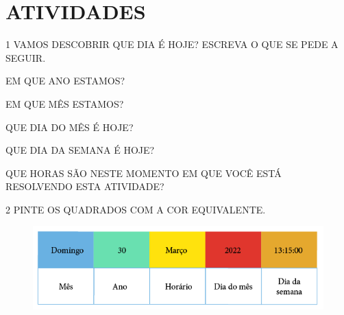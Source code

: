 \pagebreak
\section*{ATIVIDADES}

\num{1} VAMOS DESCOBRIR QUE DIA É HOJE? ESCREVA O QUE SE PEDE A SEGUIR.

\begin{escolha}
\item EM QUE ANO ESTAMOS?

\item{}

\item EM QUE MÊS ESTAMOS?

\item{}

\item QUE DIA DO MÊS É HOJE?

\item{}

\item QUE DIA DA SEMANA É HOJE?

\item{}

\item QUE HORAS SÃO NESTE MOMENTO EM QUE VOCÊ ESTÁ RESOLVENDO ESTA ATIVIDADE?

\item{}
\end{escolha}



\num{2} PINTE OS QUADRADOS COM A COR EQUIVALENTE.

\begin{figure}[htpb!]
\centering
\includegraphics[width=\textwidth]{./media/SAEB_1ANO_MAT_FIGURA49.png}
\end{figure}

